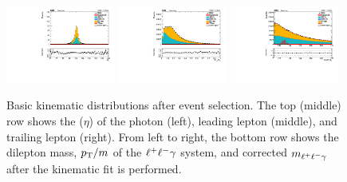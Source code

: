 \begin{figure}[tb]
\begin{center}
		\includegraphics[width=0.32\textwidth]{fig/selection/kinematics/sc_all_kin_mll_valid_ptwei_cat0.pdf}
		\includegraphics[width=0.32\textwidth]{fig/selection/kinematics/sc_all_kin_mllgmllgpt_valid_ptwei_cat0.pdf}
		\includegraphics[width=0.32\textwidth]{fig/selection/kinematics/all_kin_REFITmllg_valid_ptwei_cat0.pdf}
		\end{center}
	\caption{Basic kinematic distributions after event selection. The top (middle) row shows the \pt ($\eta$) of the photon (left), leading lepton (middle), and trailing lepton (right). From left to right, the bottom row shows the dilepton mass, $p_{\mathrm{T}}/m$ of the $\ell^{+}\ell^{-}\gamma$ system, and corrected $m_{\ell^{+}\ell^{-}\gamma}$ after the kinematic fit is performed.}
	\label{fig:basic_kinematics}
\end{figure}
